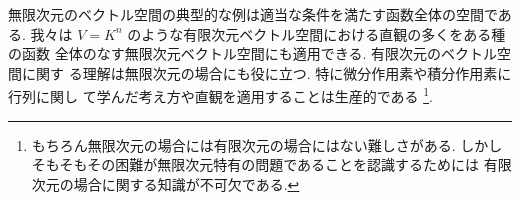 \documentclass[12pt,twoside]{jarticle}
\begin{document}


無限次元のベクトル空間の典型的な例は適当な条件を満たす函数全体の空間である.
我々は $V=K^n$ のような有限次元ベクトル空間における直観の多くをある種の函数
全体のなす無限次元ベクトル空間にも適用できる.  有限次元のベクトル空間に関す
る理解は無限次元の場合にも役に立つ.  特に微分作用素や積分作用素に行列に関し
て学んだ考え方や直観を適用することは生産的である%
\footnote{もちろん無限次元の場合には有限次元の場合にはない難しさがある.
  しかしそもそもその困難が無限次元特有の問題であることを認識するためには
  有限次元の場合に関する知識が不可欠である.}.
\end{document}
